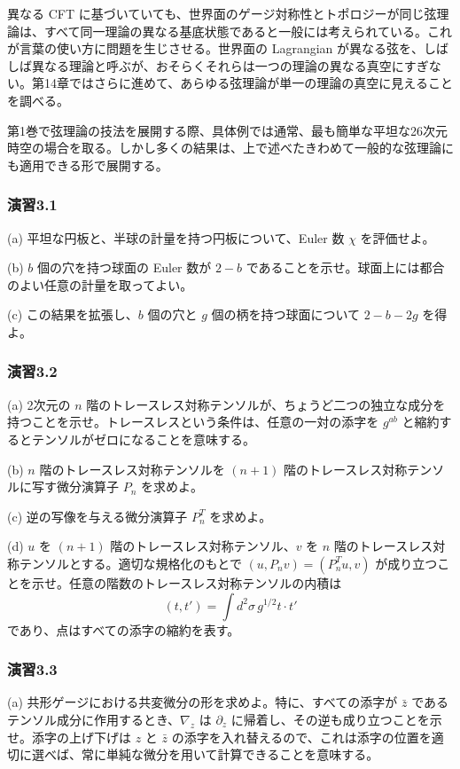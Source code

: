 異なる CFT に基づいていても、世界面のゲージ対称性とトポロジーが同じ弦理論は、すべて同一理論の異なる基底状態であると一般には考えられている。これが言葉の使い方に問題を生じさせる。世界面の Lagrangian が異なる弦を、しばしば異なる理論と呼ぶが、おそらくそれらは一つの理論の異なる真空にすぎない。第14章ではさらに進めて、あらゆる弦理論が単一の理論の真空に見えることを調べる。

第1巻で弦理論の技法を展開する際、具体例では通常、最も簡単な平坦な26次元時空の場合を取る。しかし多くの結果は、上で述べたきわめて一般的な弦理論にも適用できる形で展開する。

\label{sec:3.exercises}

\subsubsection*{演習3.1}\label{ex:3.1}
(a) 平坦な円板と、半球の計量を持つ円板について、Euler 数 $\chi$ を評価せよ。

(b) $b$ 個の穴を持つ球面の Euler 数が $2-b$ であることを示せ。球面上には都合のよい任意の計量を取ってよい。

(c) この結果を拡張し、$b$ 個の穴と $g$ 個の柄を持つ球面について $2-b-2g$ を得よ。

\medskip
\subsubsection*{演習3.2}\label{ex:3.2}
(a) 2次元の $n$ 階のトレースレス対称テンソルが、ちょうど二つの独立な成分を持つことを示せ。トレースレスという条件は、任意の一対の添字を $g^{ab}$ と縮約するとテンソルがゼロになることを意味する。

(b) $n$ 階のトレースレス対称テンソルを $(n+1)$ 階のトレースレス対称テンソルに写す微分演算子 $P_n$ を求めよ。

(c) 逆の写像を与える微分演算子 $P_n^T$ を求めよ。

(d) $u$ を $(n+1)$ 階のトレースレス対称テンソル、$v$ を $n$ 階のトレースレス対称テンソルとする。適切な規格化のもとで $(u,P_nv)=(P_n^Tu,v)$ が成り立つことを示せ。任意の階数のトレースレス対称テンソルの内積は
\[
(t,t')=\int d^2\sigma\,g^{1/2}t\cdot t'
\]
であり、点はすべての添字の縮約を表す。

\medskip
\subsubsection*{演習3.3}\label{ex:3.3}
(a) 共形ゲージにおける共変微分の形を求めよ。特に、すべての添字が $\bar z$ であるテンソル成分に作用するとき、$\nabla_z$ は $\partial_z$ に帰着し、その逆も成り立つことを示せ。添字の上げ下げは $z$ と $\bar z$ の添字を入れ替えるので、これは添字の位置を適切に選べば、常に単純な微分を用いて計算できることを意味する。

